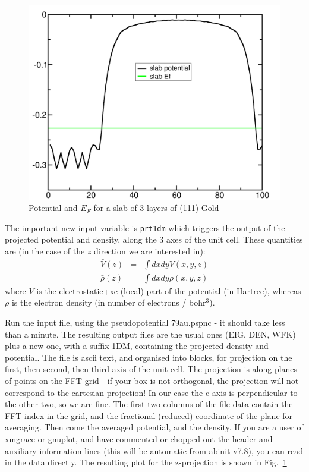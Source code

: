 \documentclass{report}
\begin{document}
\begin{figure}[h]
\begin{center}
\includegraphics[width=0.8\linewidth]{workfunction_image0}
\caption{Potential and $E_F$ for a slab of 3 layers of (111) Gold}
\label{fig1}
\end{center}
\end{figure}

The important new input variable is \texttt{prt1dm} which triggers the output of the projected potential and density, along the 3 axes of the unit cell. These quantities are (in the case of the $z$ direction we are interested in):
\begin{eqnarray}
\bar{V}(z) &=& \int dx dy V(x,y,z) \\
\bar{\rho}(z) &=& \int dx dy \rho(x,y,z)
\end{eqnarray}
where $V$ is the electrostatic+xc (local) part of the potential (in Hartree), whereas $\rho$ is the electron density (in number of electrons / bohr$^3$).

Run the input file, using the pseudopotential 79au.pspnc - it should take less than a minute. The resulting output files are the usual ones (EIG, DEN, WFK) plus a new one, with a suffix 1DM, containing the projected density and potential. The file is ascii text, and organised into blocks, for projection on the first, then second, then third axis of the unit cell. The projection is along planes of points on the FFT grid - if your box is not orthogonal, the projection will not correspond to the cartesian projection! In our case the c axis is perpendicular to the other two, so we are fine. The first two columns of the file data contain the FFT index in the grid, and the fractional (reduced) coordinate of the plane for averaging. Then come the averaged potential, and the density. If you are a user of xmgrace or gnuplot, and have commented or chopped out the header and auxiliary information lines (this will be automatic from abinit v7.8), you can read in the data directly. The resulting plot for the z-projection is shown in Fig.~\ref{fig1}
\end{document}
